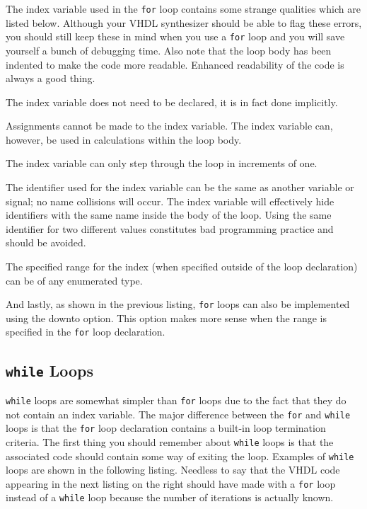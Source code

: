 The index variable used in the \texttt{for} loop contains some strange qualities which are listed below. Although your VHDL synthesizer should be able to flag these errors, you should still keep these in mind when you use a \texttt{for} loop and you will save yourself a bunch of debugging time. Also note that the loop body has been indented to make the code more readable. Enhanced readability of the code is always a good thing. 
\begin{my_list}
\item The index variable does not need to be declared, it is in fact done implicitly. 

\item Assignments cannot be made to the index variable. The index variable can, however, be used in calculations within the loop body. 

\item The index variable can only step through the loop in increments of one. 

\item The identifier used for the index variable can be the same as another variable or signal; no name collisions will occur. The index variable will effectively hide identifiers with the same name inside the body of the loop. Using the same identifier for two different values constitutes bad programming practice and should be avoided. 

\item The specified range for the index (when specified outside of the loop declaration) can be of any enumerated type.
\end{my_list}

And lastly, as shown in the previous listing, \texttt{for} loops can also be implemented using the downto option. This option makes more sense when the range is specified in the \texttt{for} loop declaration. 

\subsection{\texttt{while} Loops}
\texttt{while} loops are somewhat simpler than \texttt{for} loops due to the fact that they do not contain an index variable. The major difference between the \texttt{for} and \texttt{while} loops is that the \texttt{for} loop declaration contains a built-in loop termination criteria. The first thing you should remember about \texttt{while} loops is that the associated code should contain some way of exiting the loop. Examples of \texttt{while} loops are shown in the following listing. Needless to say that the VHDL code appearing in the next listing on the right should have made with a \texttt{for} loop instead of a \texttt{while} loop because the number of iterations is actually known. 

